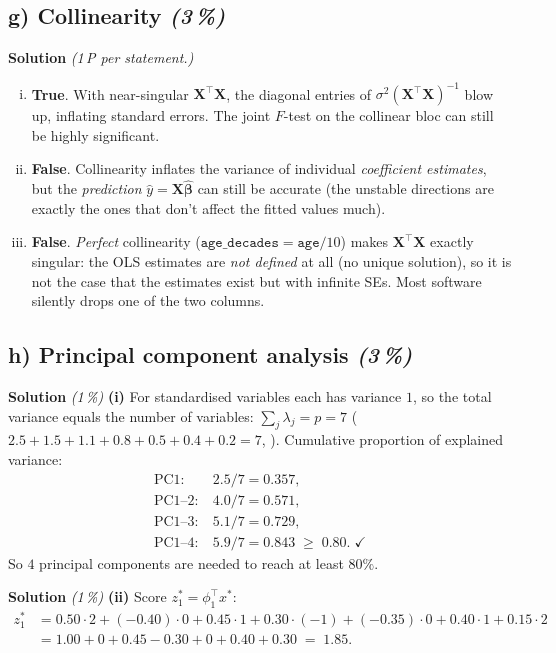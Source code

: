 \documentclass[11pt,a4paper]{article}
\newcommand{\subpoints}[1]{\textit{(#1\,\%)}}
\newcommand{\sol}{\noindent\textbf{Solution}}
\begin{document}
\subsection*{g) Collinearity \subpoints{3}}
\sol{} \emph{(1\,P per statement.)}
\begin{enumerate}[(i)]
  \item \textbf{True}. With near-singular $\mathbf X^\top\mathbf X$, the diagonal entries of
        $\sigma^2(\mathbf X^\top\mathbf X)^{-1}$ blow up, inflating standard errors. The joint
        $F$-test on the collinear bloc can still be highly significant.
  \item \textbf{False}. Collinearity inflates the variance of individual \emph{coefficient
        estimates}, but the \emph{prediction} $\hat y = \mathbf X\hat{\boldsymbol\beta}$ can still
        be accurate (the unstable directions are exactly the ones that don't affect the fitted
        values much).
  \item \textbf{False}. \emph{Perfect} collinearity ($\texttt{age\_decades} = \texttt{age}/10$) makes
        $\mathbf X^\top\mathbf X$ exactly singular: the OLS estimates are \emph{not defined} at all
        (no unique solution), so it is not the case that the estimates exist but with infinite SEs.
        Most software silently drops one of the two columns.
\end{enumerate}

\subsection*{h) Principal component analysis \subpoints{3}}

\sol{} \subpoints{1} \textbf{(i)} For standardised variables each has variance $1$, so the total
variance equals the number of variables: $\sum_j \lambda_j = p = 7$
($2.5+1.5+1.1+0.8+0.5+0.4+0.2 = 7$, \checkmark). Cumulative proportion of explained variance:
\begin{align*}
\text{PC1:}\ & 2.5/7 = 0.357, \\
\text{PC1--2:}\ & 4.0/7 = 0.571, \\
\text{PC1--3:}\ & 5.1/7 = 0.729, \\
\text{PC1--4:}\ & 5.9/7 = 0.843 \;\geq\; 0.80. \;\checkmark
\end{align*}
So $\boxed{4}$ principal components are needed to reach at least $80\%$.

\medskip
\sol{} \subpoints{1} \textbf{(ii)} Score $z^*_1 = \phi_1^\top x^*$:
\begin{align*}
z^*_1 &= 0.50\cdot 2 + (-0.40)\cdot 0 + 0.45\cdot 1 + 0.30\cdot(-1) + (-0.35)\cdot 0 + 0.40\cdot 1 + 0.15\cdot 2 \\
      &= 1.00 + 0 + 0.45 - 0.30 + 0 + 0.40 + 0.30 \;=\; \boxed{1.85}.
\end{align*}
\end{document}
